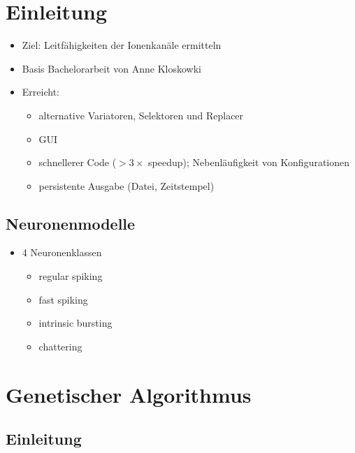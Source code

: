 \section{Einleitung}

\begin{frame}
  \begin{itemize}
  \item Ziel: Leitfähigkeiten der Ionenkanäle ermitteln
  \item Basis Bachelorarbeit von Anne Kloskowki
  \item Erreicht:
    \begin{itemize}
    \item alternative Variatoren, Selektoren und Replacer
    \item GUI
    \item schnellerer Code ($>3\times$ speedup); Nebenläufigkeit von Konfigurationen
    \item persistente Ausgabe (Datei, Zeitstempel)
    \end{itemize}
  \end{itemize}
\end{frame}


\subsection{Neuronenmodelle}

\begin{frame}
  \begin{itemize}
  \item 4 Neuronenklassen
    \begin{itemize}
    \item regular spiking
    \item fast spiking
    \item intrinsic bursting
    \item chattering
    \end{itemize}
  \end{itemize}
\end{frame}




\section{Genetischer Algorithmus}

\subsection{Einleitung}

